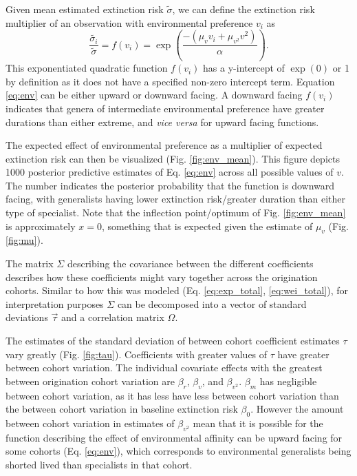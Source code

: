 \documentclass[12pt,letterpaper]{article}
\begin{document}
Given mean estimated extinction risk \(\tilde{\sigma}\), we can define the extinction risk multiplier of an observation with environmental preference \(v_{i}\) as 
\begin{equation}
  \frac{\tilde{\sigma_{i}}}{\tilde{\sigma}} = f(v_{i}) = \exp\left(\frac{-(\mu_{v} v_{i} + \mu_{v^{2}} v^{2})}{\alpha}\right).
  \label{eq:env}
\end{equation}
This exponentiated quadratic function \(f(v_{i})\) has a y-intercept of \(\exp(0)\) or 1 by definition as it does not have a specified non-zero intercept term. Equation \ref{eq:env} can be either upward or downward facing. A downward facing \(f(v_{i})\) indicates that genera of intermediate environmental preference have greater durations than either extreme, and \textit{vice versa} for upward facing functions.

The expected effect of environmental preference as a multiplier of expected extinction risk can then be visualized (Fig. \ref{fig:env_mean}). This figure depicts 1000 posterior predictive estimates of Eq. \ref{eq:env} across all possible values of \(v\). The number indicates the posterior probability that the function is downward facing, with generalists having lower extinction risk/greater duration than either type of specialist. Note that the inflection point/optimum of Fig. \ref{fig:env_mean} is approximately \(x = 0\), something that is expected given the estimate of \(\mu_{v}\) (Fig. \ref{fig:mu}).

The matrix \(\Sigma\) describing the covariance between the different coefficients describes how these coefficients might vary together across the origination cohorts. Similar to how this was modeled (Eq. \ref{eq:exp_total}, \ref{eq:wei_total}), for interpretation purposes \(\Sigma\) can be decomposed into a vector of standard deviations \(\vec{\tau}\) and a correlation matrix \(\Omega\).

The estimates of the standard deviation of between cohort coefficient estimates \(\tau\) vary greatly (Fig. \ref{fig:tau}). Coefficients with greater values of \(\tau\) have greater between cohort variation. The individual covariate effects with the greatest between origination cohort variation are \(\beta_{r}\), \(\beta_{v}\), and \(\beta_{v^{2}}\). \(\beta_{m}\) has negligible between cohort variation, as it has less have less between cohort variation than the between cohort variation in baseline extinction risk \(\beta_{0}\). However the amount between cohort variation in estimates of \(\beta_{v^{2}}\) mean that it is possible for the function describing the effect of environmental affinity can be upward facing for some cohorts (Eq. \ref{eq:env}), which corresponds to environmental generalists being shorted lived than specialists in that cohort.
\end{document}
